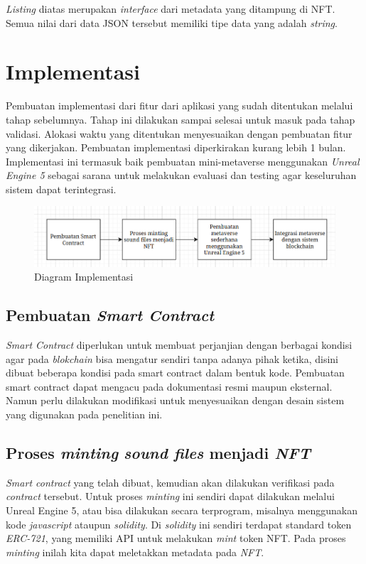\emph{Listing} diatas merupakan \emph{interface} dari metadata yang ditampung di NFT. Semua nilai dari data JSON tersebut
memiliki tipe data yang adalah \emph{string}.

\section{Implementasi}

Pembuatan implementasi dari fitur dari aplikasi yang sudah ditentukan melalui tahap
sebelumnya. Tahap ini dilakukan sampai selesai untuk masuk pada tahap validasi. Alokasi
waktu yang ditentukan menyesuaikan dengan pembuatan fitur yang dikerjakan. Pembuatan
implementasi diperkirakan kurang lebih 1 bulan. Implementasi ini termasuk baik pembuatan mini-metaverse
menggunakan \emph{Unreal Engine 5} sebagai sarana untuk melakukan evaluasi dan testing agar keseluruhan sistem dapat terintegrasi.

\begin{figure} [ht] \centering
  \includegraphics[scale=0.60]{gambar/diagramimplementasi.png}
  \caption{Diagram Implementasi}
  \label{fig:diagramimplementasi}
\end{figure}

\subsection{Pembuatan \emph{Smart Contract}}
\emph{Smart Contract} diperlukan untuk membuat perjanjian dengan
berbagai kondisi agar pada \emph{blokchain} bisa mengatur sendiri tanpa
adanya pihak ketika, disini dibuat beberapa kondisi pada
smart contract dalam bentuk kode. Pembuatan smart contract dapat mengacu pada dokumentasi resmi maupun eksternal.
Namun perlu dilakukan modifikasi untuk menyesuaikan dengan desain sistem yang digunakan pada penelitian
ini.

\subsection{Proses \emph{minting} \emph{sound files} menjadi \emph{NFT}}
\emph{Smart contract} yang telah dibuat, kemudian akan dilakukan verifikasi pada \emph{contract} tersebut. Untuk proses \emph{minting} ini sendiri
dapat dilakukan melalui Unreal Engine 5, atau bisa dilakukan secara terprogram, misalnya menggunakan kode \emph{javascript} ataupun \emph{solidity}.
Di \emph{solidity} ini sendiri terdapat standard token \emph{ERC-721}, yang memiliki API untuk melakukan \emph{mint} token NFT. Pada proses \emph{minting}
inilah kita dapat meletakkan metadata pada \emph{NFT}.

